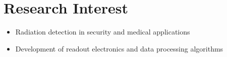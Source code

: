 \documentclass[letterpaper,11pt]{article} %
\newcommand{\CVItem}[1]{
  \item\small{
    {#1 \vspace{-2pt}}
  }
}
\newcommand{\CVItemListStart}{\begin{itemize}}
\newcommand{\CVItemListEnd}{\end{itemize}\vspace{-5pt}}
\begin{document}
\begin{comment}
try to briefly explain what you did and why it is relevant to the position you
are seeking
\end{comment}
\begin{comment}
Ideally the title of the work should speak for what it is. However if you feel
like you should explain more about why the project is applicable to this job,
use item list as is shown in the work experience section.
\end{comment}
\section{Research Interest}
  \CVItemListStart
    \CVItem{Radiation detection in security and medical applications}
    \CVItem{Development of readout electronics and data processing algorithms}
  \CVItemListEnd
\end{document}
